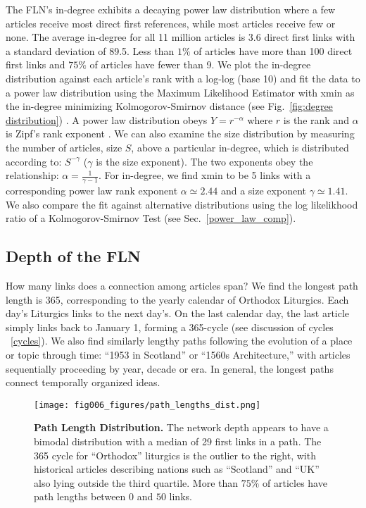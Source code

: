 \documentclass[pre,twocolumn,twoside,superscriptaddress,floatfix]{revtex4-1}
\begin{document}
{The FLN's in-degree exhibits a decaying power law distribution where a few articles 
receive most direct first references, while most articles receive few or none.
The average in-degree for all 11 million articles is 3.6 direct first links with a standard deviation of 89.5.
Less than $1\%$ of articles have more than 100 direct first links and $75\%$ of articles
have fewer than 9. 
We plot the in-degree distribution against each article's rank with a log-log (base 10) and fit the data to a power law 
distribution using the Maximum Likelihood Estimator with xmin as the in-degree minimizing Kolmogorov-Smirnov distance
(see Fig.~\ref{fig:degree distribution}) 
\cite{clauset2009power, alstott2014powerlaw}
.
A power law distribution obeys $Y = r^{-\alpha}$ where $r$ is the rank and $\alpha$ is Zipf's rank
exponent
\cite{zipf1949human}
. We can also examine the size distribution by measuring the number of articles, size $S$, above
a particular in-degree, which is distributed according to: $S^{-\gamma}$ ($\gamma$ is the size exponent). 
The two exponents obey the relationship: $\alpha = \frac{1}{\gamma -1}$.
For in-degree, we find xmin to be 5 links with a corresponding power law rank exponent $\alpha \simeq 2.44$ and a size exponent $\gamma \simeq 1.41$. 
We also compare the fit against alternative distributions using the log likelikhood ratio of a Kolmogorov-Smirnov Test 
(see Sec.~\ref{power_law_comp}).

\subsection{Depth of the FLN}

How many links does a connection among articles span? 
We find the longest path length is 365,
corresponding to the yearly calendar of Orthodox Liturgics.
Each day's Liturgics links to the next day's. On the last calendar day, the last article simply links back to January 1, forming a 365-cycle 
(see discussion of cycles ~\ref{cycles}).
We also find similarly lengthy paths following the evolution of a place or topic through time: 
``1953 in Scotland'' or ``1560s Architecture,'' with articles sequentially proceeding by year, decade or era.
In general, the longest paths connect temporally organized ideas.

\begin{figure}[tp!]
  \texttt{[image: fig006\_figures/path\_lengths\_dist.png]}
  \caption{
    \textbf{Path Length Distribution.}
The network depth appears to have a bimodal distribution with a median of 29 first links in a path.
The 365 cycle for ``Orthodox'' liturgics is the outlier to the right, with historical articles 
describing nations such as ``Scotland'' and ``UK'' also lying outside the third quartile.
More than $75\%$ of articles have path lengths between 
$0$ and $50$ links.}
  \label{fig:Path Length Distribution}
\end{figure}

}
\end{document}
